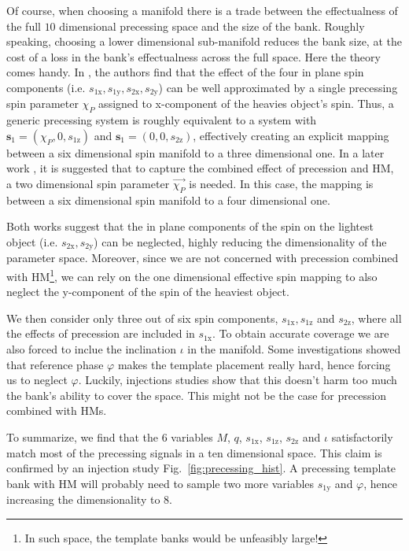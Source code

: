 \documentclass[twocolumn,showpacs,preprintnumbers,nofootinbib,prd,
superscriptaddress,10pt]{revtex4-2}
\begin{document}
Of course, when choosing a manifold there is a trade between the effectualness of the full $10$ dimensional precessing space and the size of the bank. Roughly speaking, choosing a lower dimensional sub-manifold reduces the bank size, at the cost of a loss in the bank's effectualness across the full space.
Here the theory comes handy. In \cite{Schmidt:2014iyl}, the authors find that the effect of the four in plane spin components (i.e. $s_\text{1x}, s_\text{1y}, s_\text{2x}, s_\text{2y}$) can be well approximated by a single precessing spin parameter $\chi_P$ assigned to x-component of the heavies object's spin.
Thus, a generic precessing system is roughly equivalent to a system with $\mathbf{s}_\text{1} = (\chi_P, 0, s_\text{1z})$ and $\mathbf{s}_\text{1} = (0, 0, s_\text{2z})$, effectively creating an explicit mapping between a six dimensional spin manifold to a three dimensional one.
In a later work \cite{Thomas:2020uqj}, it is suggested that to capture the combined effect of precession and HM, a two dimensional spin parameter $\vec{\chi_P}$ is needed. In this case, the mapping is between  a six dimensional spin manifold to a four dimensional one.

Both works suggest that the in plane components of the spin on the lightest object (i.e. $s_\text{2x}, s_\text{2y}$) can be neglected, highly reducing the dimensionality of the parameter space.
Moreover, since we are not concerned with precession combined with HM\footnote{In such space, the template banks would be unfeasibly large!}, we can rely on the one dimensional effective spin mapping \cite{Schmidt:2014iyl} to also neglect the y-component of the spin of the heaviest object.

We then consider only three out of six spin components, $s_\text{1x}, s_\text{1z}$ and $s_\text{2z}$, where all the effects of precession are included in $s_\text{1x}$. To obtain accurate coverage we are also forced to inclue the inclination $\iota$ in the manifold. Some investigations showed that reference phase $\varphi$ makes the template placement really hard, hence forcing us to neglect $\varphi$. Luckily, injections studies show that this doesn't harm too much the bank's ability to cover the space. This might not be the case for precession combined with HMs.

To summarize, we find that the $6$ variables $M$, $q$, $s_\text{1x}$, $s_\text{1z}$, $s_\text{2z}$ and $\iota$ satisfactorily match most of the precessing signals in a ten dimensional space.
This claim is confirmed by an injection study Fig.~\ref{fig:precessing_hist}.
A precessing template bank with HM will probably need to sample two more variables $s_\text{1y}$ and $\varphi$, hence increasing the dimensionality to $8$.
\end{document}
